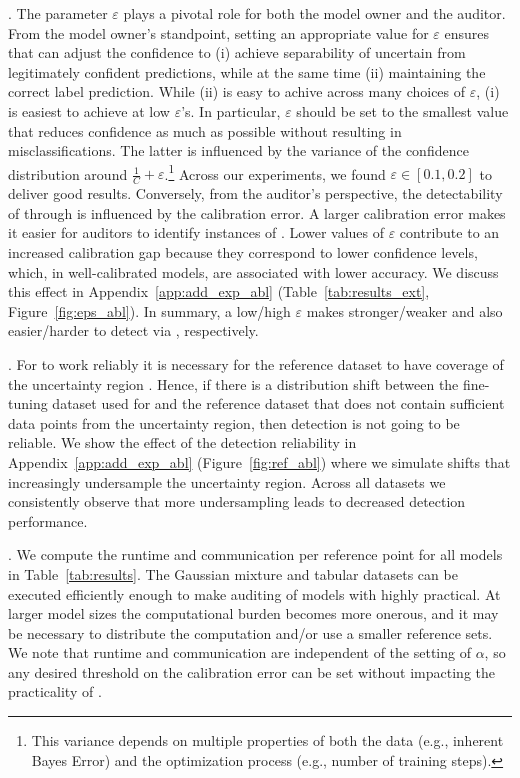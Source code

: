 . The parameter $\varepsilon$ plays a pivotal role for both the model owner and the auditor. From the model owner's standpoint, setting an appropriate value for $\varepsilon$ ensures that \attack can adjust the confidence to (i) achieve separability of uncertain from legitimately confident predictions, while at the same time (ii) maintaining the correct label prediction. While (ii) is easy to achive across many choices of $\varepsilon$, (i) is easiest to achieve at low $\varepsilon$'s. In particular, $\varepsilon$ should be set to the smallest value that reduces confidence as much as possible without resulting in misclassifications. The latter is influenced by the variance of the confidence distribution around $\frac{1}{C} + \varepsilon$.\footnote{This variance depends on multiple properties of both the data (e.g., inherent Bayes Error) and the optimization process (e.g., number of training steps).} Across our experiments, we found $\varepsilon \in [0.1,0.2]$ to deliver good results. Conversely, from the auditor's perspective, the detectability of \attack through \name is influenced by the calibration error. A larger calibration error makes it easier for auditors to identify instances of \attack. Lower values of $\varepsilon$ contribute to an increased calibration gap because they correspond to lower confidence levels, which, in well-calibrated models, are associated with lower accuracy. We discuss this effect in Appendix~\ref{app:add_exp_abl} (Table~\ref{tab:results_ext}, Figure~\ref{fig:eps_abl}). In summary, a low/high $\varepsilon$ makes \attack stronger/weaker and also easier/harder to detect via \name, respectively.

. For \name to work reliably it is necessary for the reference dataset to have coverage of the uncertainty region \uncertreg. Hence, if there is a distribution shift between the fine-tuning dataset used for \attack and the reference dataset that does not contain sufficient data points from the uncertainty region, then detection is not going to be reliable. We show the effect of the detection reliability in Appendix~\ref{app:add_exp_abl} (Figure~\ref{fig:ref_abl}) where we simulate shifts that increasingly undersample the uncertainty region. Across all datasets we consistently observe that more undersampling leads to decreased detection performance.

. We compute the runtime and communication per reference point for all models in Table~\ref{tab:results}. The Gaussian mixture and tabular datasets can be executed efficiently enough to make auditing of models with \name highly practical. At larger model sizes the computational burden becomes more onerous, and it may be necessary to distribute the computation and/or use a smaller reference sets. We note that runtime and communication are independent of the setting of $\alpha$, so any desired threshold on the calibration error can be set without impacting the practicality of \name.

